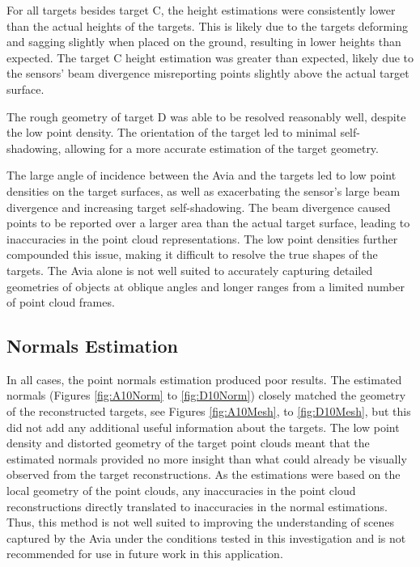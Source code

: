For all targets besides target C, the height estimations were consistently lower than the actual heights of the targets. This is likely due to the targets deforming and sagging slightly when placed on the ground, resulting in lower heights than expected. The target C height estimation was greater than expected, likely due to the sensors' beam divergence misreporting points slightly above the actual target surface.

The rough geometry of target D was able to be resolved reasonably well, despite the low point density. The orientation of the target led to minimal self-shadowing, allowing for a more accurate estimation of the target geometry.

The large angle of incidence between the Avia and the targets led to low point densities on the target surfaces, as well as exacerbating the sensor's large beam divergence and increasing target self-shadowing. The beam divergence caused points to be reported over a larger area than the actual target surface, leading to inaccuracies in the point cloud representations. The low point densities further compounded this issue, making it difficult to resolve the true shapes of the targets. The Avia alone is not well suited to accurately capturing detailed geometries of objects at oblique angles and longer ranges from a limited number of point cloud frames.



\subsection{Normals Estimation}
\label{subsec:ch8.section1.subsec2}

In all cases, the point normals estimation produced poor results. The estimated normals (Figures \ref{fig:A10Norm} to \ref{fig:D10Norm}) closely matched the geometry of the reconstructed targets, see Figures \ref{fig:A10Mesh}, to \ref{fig:D10Mesh}, but this did not add any additional useful information about the targets. The low point density and distorted geometry of the target point clouds meant that the estimated normals provided no more insight than what could already be visually observed from the target reconstructions. As the estimations were based on the local geometry of the point clouds, any inaccuracies in the point cloud reconstructions directly translated to inaccuracies in the normal estimations. Thus, this method is not well suited to improving the understanding of scenes captured by the Avia under the conditions tested in this investigation and is not recommended for use in future work in this application.

